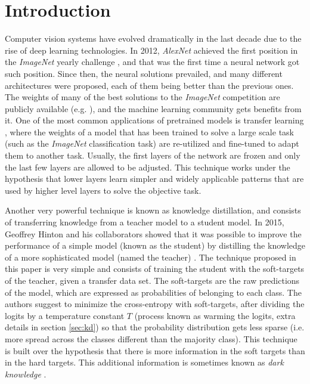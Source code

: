 \documentclass{elsarticle}
\begin{document}
	\section{Introduction}
	Computer vision systems have evolved dramatically in the last decade due to the rise of deep learning technologies. In 2012, \textit{AlexNet} \cite{krizhevsky2012} achieved the first position in the \textit{ImageNet} yearly challenge \cite{ILSVRC15}, and that was the first time a neural network got such position. Since then, the neural solutions prevailed, and many different architectures were proposed, each of them being better than the previous ones. The weights of many of the best solutions to the \textit{ImageNet} competition are publicly available (e.g. \cite{he2016, chollet2017, szegedy2016, szegedy2017, howard2017, pham2018, tan2019}), and the machine learning community gets benefits from it. One of the most common applications of pretrained models is transfer learning \cite{zhuang2021}, where the weights of a model that has been trained to solve a large scale task (such as the \textit{ImageNet} classification task) are re-utilized and fine-tuned to adapt them to another task. Usually, the first layers of the network are frozen and only the last few layers are allowed to be adjusted. This technique works under the hypothesis that lower layers learn simpler and widely applicable patterns that are used by higher level layers to solve the objective task.	
	
	Another very powerful technique is known as knowledge distillation, and consists of transferring knowledge from a teacher model to a student model. In 2015, Geoffrey Hinton and his collaborators showed that it was possible to improve the performance of a simple model (known as the student) by distilling the knowledge of a more sophisticated model (named the teacher) \cite{hinton2015}. The technique proposed in this paper is very simple and consists of training the student with the soft-targets of the teacher, given a transfer data set. The soft-targets are the raw predictions of the model, which are expressed as probabilities of belonging to each class. The authors suggest to minimize the cross-entropy with soft-targets, after dividing the logits by a temperature constant $T$ (process known as warming the logits, extra details in section \ref{sec:kd}) so that the probability distribution gets less sparse (i.e. more spread across the classes different than the majority class). This technique is built over the hypothesis that there is more information in the soft targets than in the hard targets. This additional information is sometimes known as \textit{dark knowledge} \cite{gou2020}.
	
\end{document}
